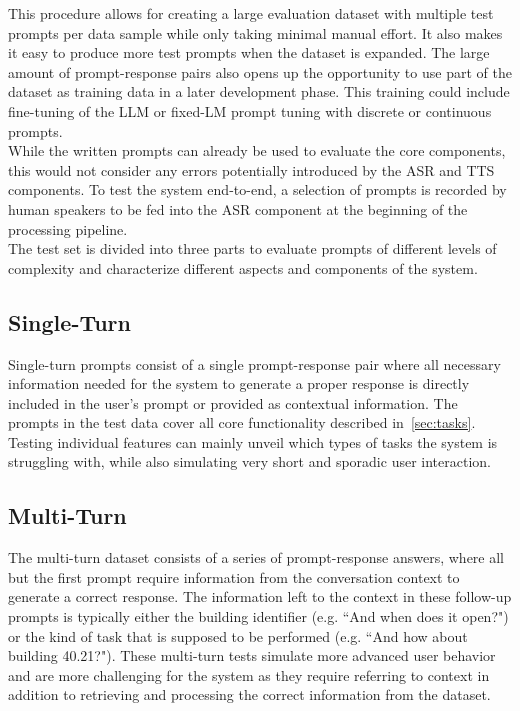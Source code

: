 \documentclass{article}
\begin{document}
This procedure allows for creating a large evaluation dataset with multiple test prompts per data sample while only taking minimal manual effort. It also makes it easy to produce more test prompts when the dataset is expanded. The large amount of prompt-response pairs also opens up the opportunity to use part of the dataset as training data in a later development phase. This training could include fine-tuning of the LLM or fixed-LM prompt tuning with discrete or continuous prompts.\\

While the written prompts can already be used to evaluate the core components, this would not consider any errors potentially introduced by the ASR and TTS components. To test the system end-to-end, a selection of prompts is recorded by human speakers to be fed into the ASR component at the beginning of the processing pipeline.\\

The test set is divided into three parts to evaluate prompts of different levels of complexity and characterize different aspects and components of the system.

\subsection{Single-Turn}
Single-turn prompts consist of a single prompt-response pair where all necessary information needed for the system to generate a proper response is directly included in the user's prompt or provided as contextual information. The prompts in the test data cover all core functionality described in~\cref{sec:tasks}. Testing individual features can mainly unveil which types of tasks the system is struggling with, while also simulating very short and sporadic user interaction.

\subsection{Multi-Turn}
The multi-turn dataset consists of a series of prompt-response answers, where all but the first prompt require information from the conversation context to generate a correct response. The information left to the context in these follow-up prompts is typically either the building identifier (e.g. ``And when does it open?") or the kind of task that is supposed to be performed (e.g. ``And how about building 40.21?"). These multi-turn tests simulate more advanced user behavior and are more challenging for the system as they require referring to context in addition to retrieving and processing the correct information from the dataset.
\end{document}
